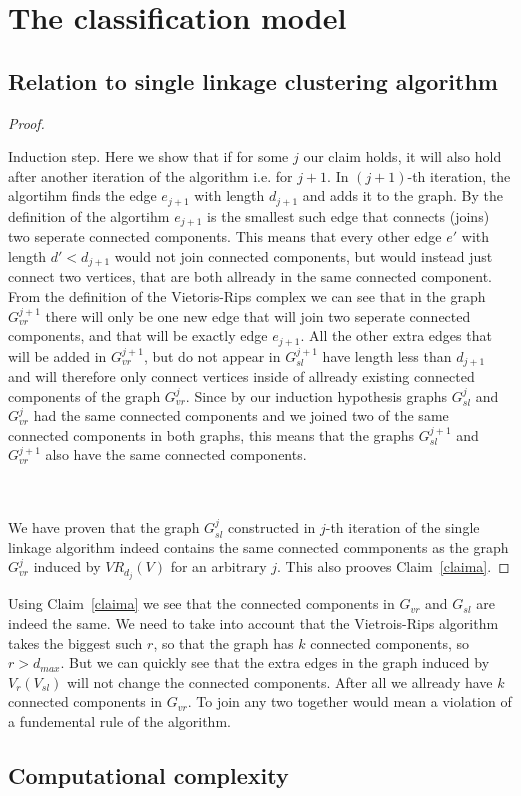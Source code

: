 \documentclass{article}
\newcommand{\enterProblemHeader}[1]{
}
\newcommand{\exitProblemHeader}[1]{
}
\newcounter{homeworkProblemCounter} %
\newcommand{\homeworkProblemName}{}
\newenvironment{homeworkProblem}[1][Problem \arabic{homeworkProblemCounter}]{ %
\stepcounter{homeworkProblemCounter} %
\renewcommand{\homeworkProblemName}{#1} %
\section{\homeworkProblemName} %
\enterProblemHeader{\homeworkProblemName} %
}{
\exitProblemHeader{\homeworkProblemName} %
}
\newcommand{\homeworkSectionName}{}
\newenvironment{homeworkSection}[1]{ %
\renewcommand{\homeworkSectionName}{#1} %
\subsection{\homeworkSectionName} %
\enterProblemHeader{\homeworkProblemName\ [\homeworkSectionName]} %
}{
\enterProblemHeader{\homeworkProblemName} %
}
\begin{document}
\begin{homeworkProblem}[The classification model]
\begin{homeworkSection}{Relation to single linkage clustering algorithm}
\begin{proof}
\begin{paragraph}{Induction step.}
Here we show that if for some $j$ our claim holds, it will also hold after another iteration of the algorithm i.e. for $j+1$. In $(j+1)$-th iteration, the algortihm finds the edge $e_{j+1}$ with length $d_{j+1}$ and adds it to the graph. By the definition of the algortihm $e_{j+1}$ is the smallest such edge that connects (joins) two seperate connected components. This means that every other edge $e'$ with length $d' < d_{j+1}$ would not join connected components, but would instead just connect two vertices, that are both allready in the same connected component. From the definition of the Vietoris-Rips complex we can see that in the graph $G_{vr}^{j+1}$ there will only be one new edge that will join two seperate connected components, and that will be exactly edge $e_{j+1}$. All the other extra edges that will be added in $G_{vr}^{j+1}$, but do not appear in  $G_{sl}^{j+1}$ have length less than $d_{j+1}$ and will therefore only connect vertices inside of allready existing connected components of the graph $G_{vr}^{j}$. Since by our induction hypothesis graphs $G_{sl}^{j}$ and $G_{vr}^{j}$ had the same connected components and we joined two of the same connected components in both graphs, this means that the graphs $G_{sl}^{j+1}$ and $G_{vr}^{j+1}$ also have the same connected components.
\end{paragraph}\\
\\
We have proven that the graph $G_{sl}^{j}$ constructed in $j$-th iteration of the single linkage algorithm indeed contains the same connected commponents as the graph $G_{vr}^{j}$ induced by $VR_{d_{j}}(V)$ for an arbitrary $j$. This also prooves Claim~\ref{claima}.
\end{proof}

Using Claim~\ref{claima} we see that the connected components in $G_{vr}$ and $G_{sl}$ are indeed the same. We need to take into account that the Vietrois-Rips algorithm takes the biggest such $r$, so that the graph has $k$ connected components, so $r > d_{max}$. But we can quickly see that the extra edges in the graph induced by $V_{r}(V_{sl})$ will not change the connected components. After all we allready have $k$ connected components in $G_{vr}$. To join any two together would mean a violation of a fundemental rule of the algorithm.

\end{homeworkSection}

\begin{homeworkSection}{Computational complexity}


\end{homeworkSection}
\end{homeworkProblem}
\end{document}
